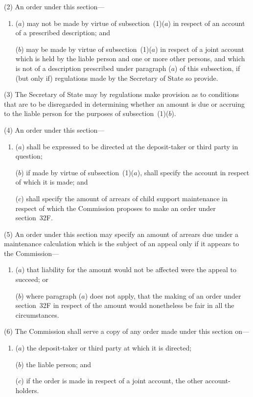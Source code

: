 \documentclass[12pt,a4paper]{article}
\begin{document}
(2) An order under this section---
\begin{enumerate}\item[]
($a$) may not be made by virtue of subsection~(1)($a$) in respect of an account of a prescribed description; and

($b$) may be made by virtue of subsection~(1)($a$) in respect of a joint account which is held by the liable person and one or more other persons, and which is not of a description prescribed under paragraph ($a$) of this subsection, if (but only if) regulations made by the Secretary of State so provide.
\end{enumerate}

(3)
The Secretary of State may by regulations make provision as to conditions that are to be disregarded in determining whether an amount is due or accruing to the liable person for the purposes of subsection~(1)($b$).

(4)
An order under this section---
\begin{enumerate}\item[]
($a$) shall be expressed to be directed at the deposit-taker or third party in question;

($b$) if made by virtue of subsection~(1)($a$), shall specify the account in respect of which it is made; and

($c$) shall specify the amount of arrears of child support maintenance in respect of which the Commission proposes to make an order under section~32F.
\end{enumerate}

(5) An order under this section may specify an amount of arrears due under a maintenance calculation which is the subject of an appeal only if it appears to the Commission---
\begin{enumerate}\item[]
($a$) that liability for the amount would not be affected were the appeal to succeed; or

($b$) where paragraph ($a$) does not apply, that the making of an order under section~32F in respect of the amount would nonetheless be fair in all the circumstances.
\end{enumerate}

(6) The Commission shall serve a copy of any order made under this section on---
\begin{enumerate}\item[]
($a$)
the deposit-taker or third party at which it is directed;

($b$)
the liable person; and

($c$)
if the order is made in respect of a joint account, the other account-holders.
\end{enumerate}
\end{document}

